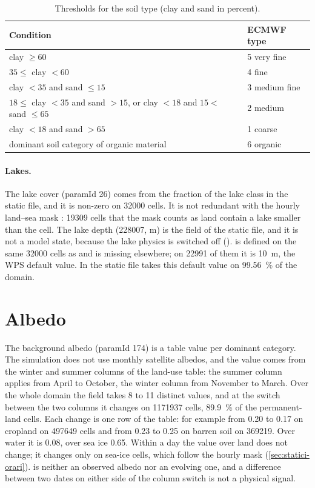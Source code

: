 \begin{table}[htbp]
  \centering
  \small
  \caption{Thresholds for the soil type  (clay and sand in percent).}
  \label{tab:slt}
  \begin{tabular}{@{}ll@{}}
    \toprule
    Condition & ECMWF type \\
    \midrule
    clay $\geq 60$ & 5 very fine \\
    $35 \leq$ clay $< 60$ & 4 fine \\
    clay $< 35$ and sand $\leq 15$ & 3 medium fine \\
    $18 \leq$ clay $< 35$ and sand $> 15$, or clay $< 18$ and $15 <$ sand $\leq 65$ & 2 medium \\
    clay $< 18$ and sand $> 65$ & 1 coarse \\
    dominant soil category of organic material & 6 organic \\
    \bottomrule
  \end{tabular}
\end{table}

\paragraph{Lakes.} The lake cover  (paramId 26) comes from the fraction of the lake class
in the static file, and it is non-zero on \num{32000} cells. It is not redundant with the hourly
land--sea mask : \num{19309} cells that the mask counts as land contain a lake smaller
than the cell. The lake depth  (228007, \si{m}) is the  field of the
static file, and it is not a model state, because the lake physics is switched off
().  is defined on the same \num{32000} cells as  and
is missing elsewhere; on \num{22991} of them it is \SI{10}{m}, the WPS default value. In the static
file  takes this default value on \SI{99.56}{\percent} of the domain.

\section{Albedo}
\label{sec:albedo}

The background albedo  (paramId 174) is a table value per dominant category. The
simulation does not use monthly satellite albedos, and the value comes from the winter and summer
columns of the land-use table: the summer column applies from April to October, the winter column
from November to March. Over the whole domain the field takes 8 to 11 distinct values, and at the
switch between the two columns it changes on \num{1171937} cells, \SI{89.9}{\percent} of the
permanent-land cells. Each change is one row of the table: for example from \num{0.20} to
\num{0.17} on cropland on \num{497649} cells and from \num{0.23} to \num{0.25} on barren soil on
\num{369219}. Over water it is \num{0.08}, over sea ice \num{0.65}. Within a day the value over land
does not change; it changes only on sea-ice cells, which follow the hourly mask
(\cref{sec:statici-orari}).  is neither an observed albedo nor an evolving one, and a
difference between two dates on either side of the column switch is not a physical signal.

